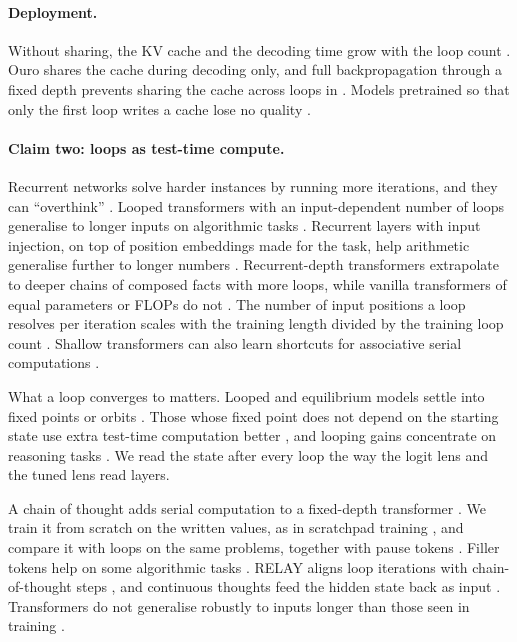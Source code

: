 \paragraph{Deployment.} Without sharing, the KV cache and the decoding time grow with the loop count
\citep{wu2025parallel,monea2026shared}. Ouro shares the cache during decoding only, and full backpropagation through a
fixed depth prevents sharing the cache across loops in \citet{huang2026towards}. Models pretrained so that only the first loop writes a cache
lose no quality \citep{monea2026shared}.

\paragraph{Claim two: loops as test-time compute.}
Recurrent networks solve harder instances by running more iterations, and they can ``overthink''
\citep{schwarzschild2021can,bansal2022endtoend}. Looped transformers with an input-dependent number of loops generalise
to longer inputs on algorithmic tasks \citep{fan2025looped}. Recurrent layers with input injection,
on top of position embeddings made for the task, help arithmetic generalise further to longer numbers
\citep{mcleish2024arithmetic}. Recurrent-depth transformers extrapolate to deeper chains of composed facts with more
loops, while vanilla transformers of equal parameters or FLOPs do not \citep{kohli2026loop}. The number of input
positions a loop resolves per iteration scales with the training length divided by the training loop count
\citep{zhang2026recurrence}.
Shallow transformers can also learn shortcuts for associative serial computations \citep{liu2022shortcuts}.

What a loop converges to matters. Looped and equilibrium models settle into fixed points or orbits
\citep{geiping2025scaling,logan2026pertoken,bai2019deep}. Those whose fixed point does not depend on the starting state
use extra test-time computation better \citep{anil2022path}, and looping gains concentrate on reasoning tasks
\citep{saunshi2025reasoning}. We read the state after every loop the way the logit lens \citep{nostalgebraist2020logit}
and the tuned lens \citep{belrose2023tuned} read layers.

A chain of thought \citep{wei2022chain} adds serial computation to a fixed-depth transformer \citep{merrill2024expressive}.
We train it from scratch on the written values, as in scratchpad training \citep{nye2021show}, and compare it with loops
on the same problems, together with pause tokens \citep{goyal2024think}. Filler tokens help on some algorithmic tasks
\citep{pfau2024dot}. RELAY aligns loop iterations with chain-of-thought steps \citep{yu2025relay}, and continuous
thoughts feed the hidden state back as input \citep{hao2025training}. Transformers do not generalise robustly to inputs
longer than those seen in training \citep{zhou2024transformers,cho2024position}.

